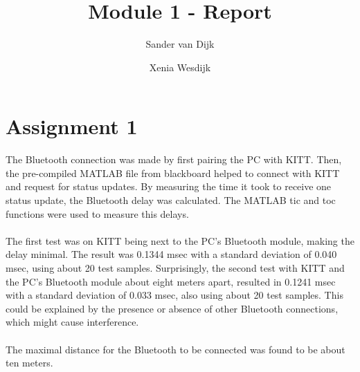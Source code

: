\documentclass[final]{scrreprt} %
\title{Module 1 - Report}
\author{Sander {van Dijk} \and Xenia {Wesdijk}}
\begin{document}
\chapter{Assignment 1}
The Bluetooth connection was made by first pairing the PC with KITT. Then, the pre-compiled MATLAB file from blackboard helped to connect with KITT and request for status updates. By measuring the time it took to receive one status update, the Bluetooth delay was calculated. The MATLAB tic and toc functions were used to measure this delays.
\\ \\
The first test was on KITT being next to the PC's Bluetooth module, making the delay minimal. The result was 0.1344 msec with a standard deviation of 0.040 msec, using about 20 test samples. Surprisingly, the second test with KITT and the PC's Bluetooth module about eight meters apart, resulted in 0.1241 msec with a standard deviation of 0.033 msec, also using about 20 test samples. This could be explained by the presence or absence of other Bluetooth connections, which might cause interference.
\\ \\
The maximal distance for the Bluetooth to be connected was found to be about ten meters.
\end{document}
